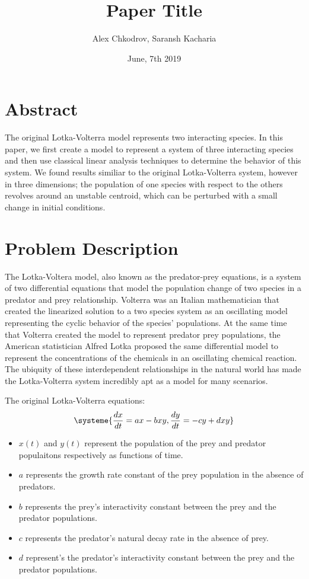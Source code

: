 \documentclass[11pt,oneside]{article}
\title{Paper Title}
\author{Alex Chkodrov, Saransh Kacharia}
\date{June, 7th 2019}
\begin{document}
	\maketitle
	\pagestyle{fancy}
	\section{Abstract}
	The original Lotka-Volterra model represents two interacting species. In this paper, we first create a model to represent a system of three interacting species and then use classical linear analysis techniques to determine the behavior of this system. We found results similiar to the original Lotka-Volterra system, however in three dimensions; the population of one species with respect to the others revolves around an unstable centroid, which can be perturbed with a small change in initial conditions.
	
	\section{Problem Description}
	The Lotka-Voltera model, also known as the predator-prey equations, is a system of two differential equations that model the population change of two species in a predator and prey relationship. Volterra was an Italian mathematician that created the linearized solution to a two species system as an oscillating model representing the cyclic behavior of the species' populations. At the same time that Volterra created the model to represent predator prey populations, the American statistician Alfred Lotka proposed the same differential model to represent the  concentrations of the chemicals in an oscillating chemical reaction. The ubiquity of these interdependent relationships in the natural world has made the Lotka-Volterra system incredibly apt as a model for many scenarios.
	
	The original Lotka-Volterra equations:
	\begin{equation}
	\systeme{
		\frac{dx}{dt} = ax - bxy,
		\frac{dy}{dt} = -cy + dxy
	}
	\end{equation}
	\begin{itemize}
		\item $x(t)$ and $y(t)$ represent the population of the prey and predator populaitons respectively as functions of time.
		\item $a$ represents the growth rate constant of the prey population in the absence of predators.
		\item $b$ represents the prey's interactivity constant between the prey and the predator populations.
		\item $c$ represents the predator's natural decay rate in the absence of prey.
		\item $d$ represent's the predator's interactivity constant between the prey and the predator populations.
	\end{itemize}
	
\end{document}
